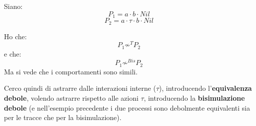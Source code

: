 \documentclass[a4paper,12pt, oneside]{book}
\begin{document}
\begin{esempio}
  Siano:
  \[P_1=a\cdot b\cdot Nil\]
  \[P_2=a\cdot \tau \cdot b\cdot Nil\]
   \begin{center}
  \end{center}
   \begin{center}
  \end{center}
  Ho che:
  \[P_1\not\sim^T P_2\]
  e che:
  \[P_1\not\sim^{Bis} P_2\]
  Ma si vede che i comportamenti sono simili.
  \label{debole}
\end{esempio}
Cerco quindi di astrarre dalle interazioni interne ($\tau$), introducendo
l'\textbf{equivalenza debole}, volendo astrarre rispetto alle azioni $\tau$,
introducendo la \textbf{bisimulazione debole} (e nell'esempio precedente i due
processi sono debolmente equivalenti sia per le tracce che per la
bisimulazione).
\end{document}
